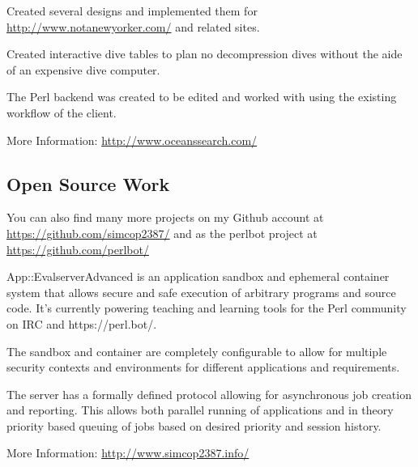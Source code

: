 \documentclass[table,tmargin=1in,bmargin=1in,letterpaper]{resume}
\begin{document}
\begin{compactitem}
\item Created several designs and implemented them for \url{http://www.notanewyorker.com/} and related sites.
\end{compactitem}


\begin{compactitem}
\item Created interactive dive tables to plan no decompression dives without the aide of an expensive dive computer.
\item The Perl backend was created to be edited and worked with using the existing workflow of the client.
\item More Information: \url{http://www.oceanssearch.com/}
\end{compactitem}

\vspace{0.2in}

\subsection{Open Source Work}

\begin{compactitem}
\item You can also find many more projects on my Github account at \url{https://github.com/simcop2387/} and as the perlbot project at \url{https://github.com/perlbot/}
\end{compactitem}

\begin{compactitem}
\item App::EvalserverAdvanced is an application sandbox and ephemeral container system that allows secure and safe execution of arbitrary programs and source code.  It's currently powering teaching and learning tools for the Perl community on IRC and https://perl.bot/. 
\item The sandbox and container are completely configurable to allow for multiple security contexts and environments for different applications and requirements.
\item The server has a formally defined protocol allowing for asynchronous job creation and reporting.  This allows both parallel running of applications and in theory priority based queuing of jobs based on desired priority and session history.
\item More Information: \url{http://www.simcop2387.info/}
\end{compactitem}
\end{document}

